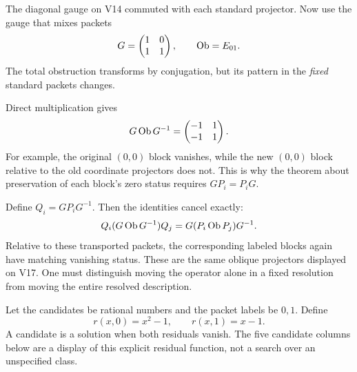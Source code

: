 
The diagonal gauge on V14 commuted with each standard projector. Now use the gauge that mixes packets
\[
G=\begin{pmatrix}1&0\\1&1\end{pmatrix},\qquad \operatorname{Ob}=E_{01}.
\]
The total obstruction transforms by conjugation, but its pattern in the \emph{fixed} standard packets changes.


Direct multiplication gives
\[
G\operatorname{Ob} G^{-1}=\begin{pmatrix}-1&1\\-1&1\end{pmatrix}.
\]
For example, the original $(0,0)$ block vanishes, while the new $(0,0)$ block relative to the old coordinate projectors does not. This is why the theorem about preservation of each block's zero status requires $G P_i=P_iG$.

Define $Q_i=GP_iG^{-1}$. Then the identities cancel exactly:
\[
Q_i(G\operatorname{Ob} G^{-1})Q_j=G(P_i\operatorname{Ob} P_j)G^{-1}.
\]
Relative to these transported packets, the corresponding labeled blocks again have matching vanishing status. These are the same oblique projectors displayed on V17. One must distinguish moving the operator alone in a fixed resolution from moving the entire resolved description.


Let the candidates be rational numbers and the packet labels be $0,1$. Define
\[
r(x,0)=x^2-1,\qquad r(x,1)=x-1.
\]
A candidate is a solution when both residuals vanish. The five candidate columns below are a display of this explicit residual function, not a search over an unspecified class.


